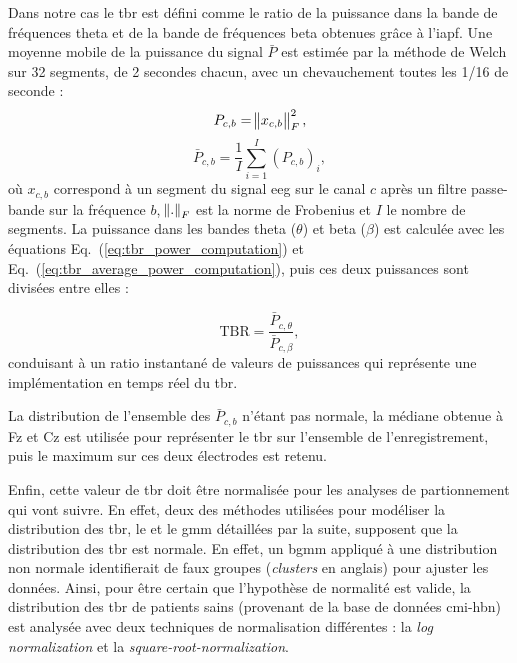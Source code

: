 Dans notre cas le \gls{tbr} est défini comme le ratio de la puissance dans la bande de fréquences theta et de la bande de fréquences beta obtenues 
grâce à l'\gls{iapf}. Une moyenne mobile de la puissance du signal $\bar{P}$ est estimée par la méthode de Welch \citep{Welch1967} sur 32 segments, de 2 secondes chacun, avec un 
chevauchement toutes les 1/16 de seconde :
\begin{equation}
\label{eq:tbr_power_computation}
P_{c,b} = \norm{ x_{c,b} }_{F}^2,
\end{equation}
\begin{equation}
\label{eq:tbr_average_power_computation}
\bar{P}_{c,b} = \frac{1}{I} \sum_{i=1}^{I} (P_{c,b})_{i},
\end{equation}
où $x_{c,b}$ correspond à un segment du signal \gls{eeg} sur le canal $c$ après un filtre passe-bande sur la fréquence $b$, $\norm{.}_{F}$ est la norme de Frobenius et $I$ 
le nombre de segments. La puissance dans les bandes theta ($\theta$) et beta ($\beta$) est calculée avec les équations Eq.~(\ref{eq:tbr_power_computation}) et Eq.~(\ref{eq:tbr_average_power_computation}),
puis ces deux puissances sont divisées entre elles :

\begin{equation}
\label{eq:tbr_tbr_computation}
\text{TBR} = \frac{\bar{P}_{c,\theta}}{\bar{P}_{c,\beta}},
\end{equation}
conduisant à un ratio instantané de valeurs de puissances qui représente une implémentation en temps réel du \gls{tbr}.

La distribution de l'ensemble des $\bar{P}_{c,b}$ n'étant pas normale, la médiane obtenue à Fz et Cz est utilisée pour représenter le \gls{tbr} sur l'ensemble 
de l'enregistrement, puis le maximum sur ces deux électrodes est retenu.

Enfin, cette valeur de \gls{tbr} doit être normalisée pour les analyses de partionnement qui vont suivre. En effet, deux des méthodes utilisées pour modéliser la distribution des \gls{tbr},
le  et le \gls{gmm} détaillées par la suite, supposent que la distribution des \gls{tbr} est normale. 
En effet, un \gls{bgmm} appliqué à une distribution non normale identifierait de faux groupes (\textit{clusters} en anglais) pour ajuster les données. 
Ainsi, pour être certain que l'hypothèse de normalité est valide, la distribution des \gls{tbr} de patients sains (provenant de la base de données \gls{cmi-hbn})
est analysée avec deux techniques de normalisation différentes : la \textit{log normalization} et la \textit{square-root-normalization}.

